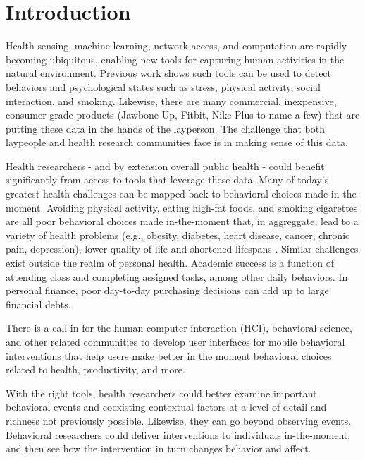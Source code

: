
\section{Introduction} %




Health sensing, machine learning, network access, and computation are rapidly becoming ubiquitous, enabling new tools for capturing human activities in the natural environment.
Previous work shows such tools can be used to detect behaviors and psychological states such as stress\cite{chang2011,lu2012}, physical activity\cite{li2010,emken2012}, social interaction\cite{wyatt2011}, and smoking\cite{sazonov2011}. Likewise, there are many commercial, inexpensive, consumer-grade products (Jawbone Up, Fitbit, Nike Plus to name a few) that are putting these data in the hands of the layperson. The challenge that both laypeople and health research communities face is in making sense of this data.

Health researchers - and by extension overall public health - could benefit significantly from access to tools that leverage these data.    Many of today's greatest health challenges can be mapped back to  behavioral choices made in-the-moment.  Avoiding physical activity, eating high-fat foods, and smoking cigarettes are all poor behavioral choices made in-the-moment that, in aggreggate, lead to a variety of health problems (e.g., obesity, diabetes, heart disease, cancer, chronic pain, depression), lower quality of life and shortened lifespans \cite{franco2005, dunn2001, yanbaeva2007, ross2000}.
Similar challenges exist outside the realm of personal health.
Academic success is a function of attending class and completing assigned tasks, among other daily behaviors\cite{cooper2006}.
In personal finance, poor day-to-day purchasing decisions can add up to large financial debts\cite{norvilitis2003}.

There is a call in for the human-computer interaction (HCI), behavioral science, and other related communities to develop user interfaces for mobile behavioral interventions that help users make better in the moment behavioral choices related to health\cite{klasnja2012,nahum2012}, productivity\cite{ho2005,sohn2005,jewell2011}, and more.

With the right tools, health researchers could better examine important behavioral events and coexisting contextual factors at a level of detail and richness not previously possible.
Likewise, they can go beyond observing events.
Behavioral researchers could deliver interventions to individuals in-the-moment, and then see how the intervention in turn changes behavior and affect.

